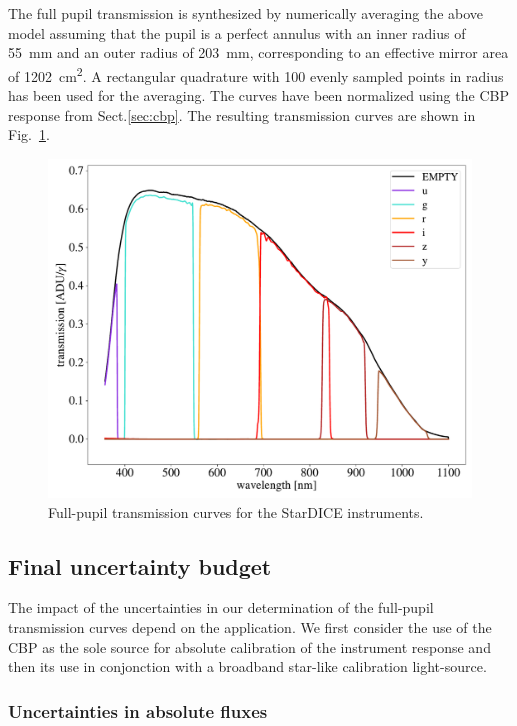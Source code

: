 The full pupil transmission is synthesized by numerically averaging
the above model assuming that the pupil is a perfect annulus with an
inner radius of \SI{55}{mm} and an outer radius of \SI{203}{mm}, corresponding to an effective mirror area of \SI{1202}{cm^2}. A
rectangular quadrature with 100 evenly sampled points in radius has
been used for the averaging. The curves have been normalized using the
CBP response from Sect.\ref{sec:cbp}. The resulting transmission curves are shown in
Fig.~\ref{fig:fullpupiltrans}.
\begin{figure}
  \centering
  \includegraphics[width=1\linewidth]{fig/fullpupill.pdf}
  \caption{Full-pupil transmission curves for the StarDICE instruments.}
  \label{fig:fullpupiltrans}
\end{figure}


\subsection{Final uncertainty budget}

The impact of the uncertainties in our determination of the full-pupil
transmission curves depend on the application. We first consider the
use of the CBP as the sole source for absolute calibration of the
instrument response and then its use in conjonction with a broadband
star-like calibration light-source.

\subsubsection{Uncertainties in absolute fluxes}
\label{sec:absolute}

